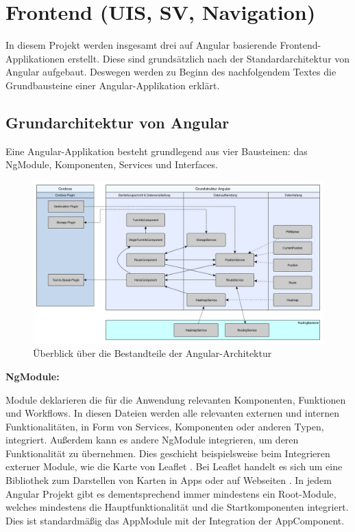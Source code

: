 \section{Frontend (UIS, SV, Navigation)}
\label{sec:arch:frontend}
In diesem Projekt werden insgesamt drei auf Angular basierende Frontend-Applikationen erstellt. 
Diese sind grundsätzlich nach der Standardarchitektur von Angular aufgebaut. 
Deswegen werden zu Beginn des nachfolgendem Textes die Grundbausteine einer Angular-Applikation erklärt.

\subsection{Grundarchitektur von Angular}
Eine Angular-Applikation besteht grundlegend aus vier Bausteinen: das NgModule, Komponenten, Services und Interfaces.

\begin{figure}[!htb]
	\centering
	\includegraphics[width=\textwidth]{ressourcen/Architektur-Navigation}
	\caption{Überblick über die Bestandteile der Angular-Architektur}
	\label{fig:ArchtekturFrontend}
\end{figure}

\textbf{NgModule:}

Module deklarieren die für die Anwendung relevanten Komponenten, Funktionen und Workflows.
In diesen Dateien werden alle relevanten externen und internen Funktionalitäten, in Form von Services, Komponenten oder anderen Typen, integriert. 
Außerdem kann es andere NgModule integrieren, um deren Funktionalität zu übernehmen. 
Dies geschieht beispielsweise beim Integrieren externer Module, wie die Karte von Leaflet \cite{leaflet}.
Bei Leaflet handelt es sich um eine Bibliothek zum Darstellen von Karten in Apps oder auf Webseiten \cite{leaflet}. 
In jedem Angular Projekt gibt es dementsprechend immer mindestens ein Root-Module, welches mindestens die Hauptfunktionalität und die Startkomponenten integriert. 
Dies ist standardmäßig das AppModule mit der Integration der AppComponent.


